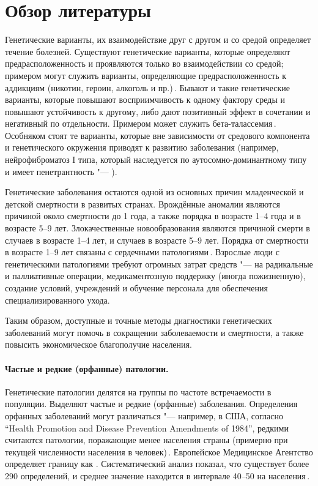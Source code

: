 \documentclass[a4paper,14pt]{extarticle}
\newcommand{\thousands}{тыс.}
\newcommand{\mln}{млн}
\begin{document}
\section{Обзор литературы}

Генетические варианты, их взаимодействие друг с другом и со средой определяет течение болезней.
Существуют генетические варианты, которые определяют предрасположенность и проявляются только во взаимодействии со средой; примером могут служить варианты, определяющие предрасположенность к аддикциям (никотин, героин, алкоголь и пр.)\,\citep{Hiroi_2004}.
Бывают и такие генетические варианты, которые повышают восприимчивость к одному фактору среды и повышают устойчивость к другому, либо дают позитивный эффект в сочетании и негативный по отдельности.
Примером может служить бета-талассемия\,\citep{Galanello_2010}.
Особняком стоят те варианты, которые вне зависимости от средового компонента и генетического окружения приводят к развитию заболевания (например, нейрофиброматоз I типа, который наследуется по аутосомно-доминантному типу и имеет  пенетрантность "--- \citealp{Jett_2009}).

Генетические заболевания остаются одной из основных причин младенческой и детской смертности в развитых странах.
Врождённые аномалии являются причиной около  смертности до 1 года, а также порядка  в возрасте 1--4 года и  в возрасте 5--9 лет.
Злокачественные новообразования являются причиной смерти в  случаев в возрасте 1--4 лет, и  случаев в возрасте 5--9 лет.
Порядка  от смертности в возрасте 1--9 лет связаны с сердечными патологиями\,\citep{Field_2003}.
Взрослые люди с генетическими патологиями требуют огромных затрат средств "--- на радикальные и паллиативные операции, медикаментозную поддержку (иногда пожизненную), создание условий, учреждений и обучение персонала для обеспечения специализированного ухода.

Таким образом, доступные и точные методы диагностики генетических заболеваний могут помочь в сокращении заболеваемости и смертности, а также повысить экономическое благополучие населения.

\paragraph{Частые и редкие (орфанные) патологии.}
Генетические патологии делятся на группы по частоте встречаемости в популяции.
Выделяют частые и редкие (орфанные) заболевания.
Определения орфанных заболеваний могут различаться "--- например, в США, согласно \textenglish{``Health Promotion and Disease Prevention Amendments of 1984''}, редкими считаются патологии, поражающие менее \numprint[\thousands]{200} населения страны (примерно  при текущей численности населения в \numprint[\mln]{326} человек)\,\citep{Herder_2017}.
Европейское Медицинское Агентство определяет границу как .
Систематический анализ показал, что существует более 290 определений, и среднее значение находится в интервале 40--50 на \numprint[\thousands]{100} населения\,\citep{Richter_2015}.
\end{document}
